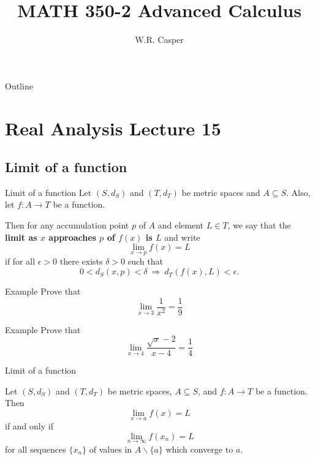 \documentclass{beamer}
\title{MATH 350-2 Advanced Calculus}
\subtitle
{} %
\author[W.R. Casper] %
{W.R. Casper}
\institute[California State University Fullerton] %
{
  Department of Mathematics\\
  California State University Fullerton}
\begin{document}
\begin{frame}
  \titlepage
\end{frame}

\begin{frame}{Outline}
  \tableofcontents
\end{frame}



\section{Real Analysis Lecture 15}


\subsection{Limit of a function}

\begin{frame}{Limit of a function}
Let $(S,d_S)$ and $(T,d_T)$ be metric spaces and $A\subseteq S$.
\pause
Also, let $f: A\rightarrow T$ be a function.
\pause
\begin{defn}
\pause
Then for any accumulation point $p$ of $A$ and element $L\in T$, we say that the \textbf{limit as $x$ approaches $p$ of $f(x)$ is $L$}
\pause
 and write
$$\lim_{x\rightarrow p} f(x) = L$$
\pause
if for all $\epsilon > 0$ there exists $\delta > 0$ such that
$$0 < d_S(x,p) < \delta\ \Rightarrow\ d_T(f(x),L) < \epsilon.$$
\end{defn}
\end{frame}

\begin{frame}{Example}
Prove that
$$\lim_{x\rightarrow 3}\frac{1}{x^2} = \frac{1}{9}$$
\end{frame}

\begin{frame}{Example}
Prove that
$$\lim_{x\rightarrow 4}\frac{\sqrt{x}-2}{x-4} = \frac{1}{4}$$
\end{frame}

\begin{frame}{Limit of a function}
\begin{thm}
\pause
Let $(S,d_S)$ and $(T,d_T)$ be metric spaces, $A\subseteq S$, and $f: A\rightarrow T$ be a function.
\pause
Then
$$\lim_{x\rightarrow a} f(x) = L$$
\pause
if and only if
$$\lim_{n\rightarrow \infty} f(x_n) = L$$
for all sequences $\{x_n\}$ of values in $A\backslash \{a\}$ which converge to $a$.
\end{thm}
\end{frame}
\end{document}
